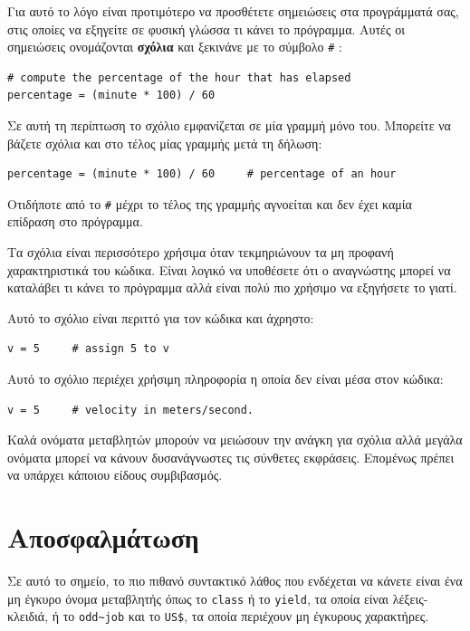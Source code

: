 \documentclass[10pt]{book}
\begin{document}
Για αυτό το λόγο είναι προτιμότερο να προσθέτετε σημειώσεις στα προγράμματά σας, στις οποίες να εξηγείτε σε φυσική γλώσσα τι κάνει το πρόγραμμα. Αυτές οι σημειώσεις ονομάζονται {\bf σχόλια} και ξεκινάνε με το σύμβολο \verb"#" :

\begin{verbatim}
# compute the percentage of the hour that has elapsed
percentage = (minute * 100) / 60
\end{verbatim}
%

Σε αυτή τη περίπτωση το σχόλιο εμφανίζεται σε μία γραμμή μόνο του. Μπορείτε
να βάζετε σχόλια και στο τέλος μίας γραμμής μετά τη δήλωση:

\begin{verbatim}
percentage = (minute * 100) / 60     # percentage of an hour
\end{verbatim}
%

Οτιδήποτε από το {\tt \#} μέχρι το τέλος της γραμμής αγνοείται
και δεν έχει καμία επίδραση στο πρόγραμμα.

Τα σχόλια είναι περισσότερο χρήσιμα όταν τεκμηριώνουν τα μη προφανή χαρακτηριστικά του κώδικα. Είναι λογικό να υποθέσετε ότι ο αναγνώστης μπορεί να καταλάβει τι κάνει το πρόγραμμα αλλά είναι πολύ πιο χρήσιμο να εξηγήσετε το γιατί.

Αυτό το σχόλιο είναι περιττό για τον κώδικα και άχρηστο:


\begin{verbatim}
v = 5     # assign 5 to v
\end{verbatim}
%

Αυτό το σχόλιο περιέχει χρήσιμη πληροφορία η οποία δεν είναι μέσα
στον κώδικα:


\begin{verbatim}
v = 5     # velocity in meters/second.
\end{verbatim}
%

Καλά ονόματα μεταβλητών μπορούν να μειώσουν την ανάγκη για σχόλια 
αλλά μεγάλα ονόματα μπορεί να κάνουν δυσανάγνωστες τις σύνθετες εκφράσεις.
Επομένως πρέπει να υπάρχει κάποιου είδους συμβιβασμός.


\section{Αποσφαλμάτωση}

Σε αυτό το σημείο, το πιο πιθανό συντακτικό λάθος που ενδέχεται να κάνετε
είναι ένα μη έγκυρο όνομα μεταβλητής όπως το {\tt class} ή το
{\tt yield}, τα οποία είναι λέξεις-κλειδιά, ή το \verb"odd~job"
και το \verb"US$", τα οποία περιέχουν μη έγκυρους χαρακτήρες.
\end{document}

